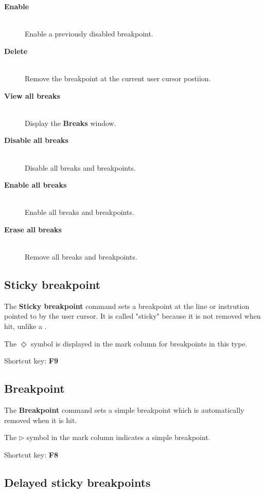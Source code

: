 \begin{description}
\item[{\bf Enable}] \mbox{} \\
    Enable a previously disabled breakpoint.
\item[{\bf Delete}] \mbox{} \\
    Remove the breakpoint at the current user cursor postiion.
\item[{\bf View all breaks}] \mbox{} \\
    Display the {\bf Breaks} window.
\item[{\bf Disable all breaks}] \mbox{} \\
    Disable all breaks and breakpoints.
\item[{\bf Enable all breaks}] \mbox{} \\
    Enable all breaks and breakpoints.
\item[{\bf Erase all breaks}] \mbox{} \\
    Remove all breaks and breakpoints.
\end{description}

\subsection{Sticky breakpoint}
\label{dialog:breaks:sticky}

The {\bf Sticky breakpoint} command sets a breakpoint
at the line or instrution pointed to by the user cursor.
It is called "sticky" because it is not removed when hit,
unlike a .

The $\Diamond$ symbol is displayed in the mark column for
breakpoints in this type.

Shortcut key: {\bf F9}

\subsection{Breakpoint}
\label{dialog:breaks:simple}

The {\bf Breakpoint} command sets a simple breakpoint which is
automatically removed when it is hit.

The $\rhd$ symbol in the mark column indicates a simple breakpoint.

Shortcut key: {\bf F8}

\subsection{Delayed sticky breakpoints}
\label{dialog:breaks:delayedsticky}

